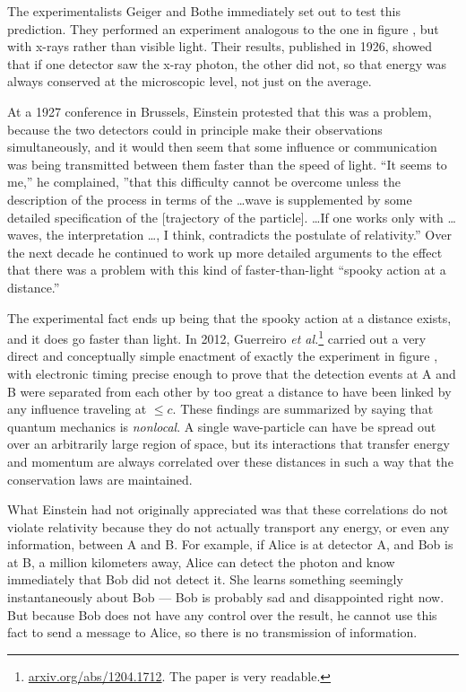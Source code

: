 The experimentalists Geiger and Bothe immediately set out to test this
prediction. They performed an experiment analogous to the one in
figure , but with x-rays rather than visible
light.  Their results, published in 1926, showed that if one detector
saw the x-ray photon, the other did not, so that energy was always
conserved at the microscopic level, not just on the average.

At a 1927 conference in Brussels, Einstein protested that this was a
problem, because the two detectors could in principle make their
observations simultaneously, and it would then seem that some
influence or communication was being transmitted between them faster
than the speed of light.  ``It seems to me,'' he complained, ''that
this difficulty cannot be overcome unless the description of the
process in terms of the \ldots wave is supplemented by some detailed
specification of the [trajectory of the particle]. \ldots If one works
only with \ldots waves, the interpretation \ldots, I think,
contradicts the postulate of relativity.'' Over the next decade he continued to work
up more detailed arguments to the effect that there was a problem with
this kind of faster-than-light ``spooky action at a distance.''

The experimental fact ends up being that the spooky action at a distance
exists, and it does go faster than light. In 2012, Guerreiro 
\emph{et al.}\footnote{\url{arxiv.org/abs/1204.1712}. The paper is very readable.}
carried out a very direct and conceptually simple enactment of exactly the experiment
in figure , with electronic timing precise enough to
prove that the detection events at A and B were separated from each other by
too great a distance to have been linked by any influence traveling at $\le c$.
These findings are summarized by saying that quantum mechanics is \emph{nonlocal}.
A single wave-particle can have be spread out over an arbitrarily
large region of space, but its interactions that transfer energy and momentum
are always correlated over these distances in such a way that the conservation
laws are maintained.

What Einstein had not originally appreciated was that these correlations do
not violate relativity because they do not actually transport any energy, or even any
information, between A and B. For example, if Alice is at detector A, and Bob is at B,
a million kilometers away, Alice can detect the photon and know immediately that
Bob did not detect it. She learns something seemingly instantaneously about Bob --- Bob
is probably sad and disappointed right now. But because Bob does not have any
control over the result, he cannot use this fact to send a message to Alice,
so there is no transmission of information.

